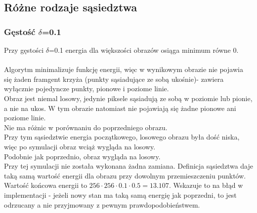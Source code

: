 \subsection{Różne rodzaje sąsiedztwa}
\subsubsection{Gęstość $\delta$=0.1}
Przy gęstości $\delta$=0.1 energia dla większości obrazów osiąga minimum równe 0.\\
\\
Algorytm minimalizuje funkcję energii, więc w wynikowym obrazie nie pojawia się żaden framgent krzyża (punkty sąsiadujące ze sobą ukośnie)- zawiera wyłącznie pojedyncze punkty, pionowe i poziome linie.\\
Obraz jest niemal losowy, jedynie piksele sąsiadują ze sobą w poziomie lub pionie, a nie na ukos.
W tym obrazie natomiast nie pojawiają się żadne pionowe ani poziome linie.\\
Nie ma różnic w porównaniu do poprzedniego obrazu.\\
Przy tym sąsiedztwie energia początkowego, losowego obrazu była dość niska, więc po symulacji obraz wciąż wygląda na losowy.\\
Podobnie jak poprzednio, obraz wygląda na losowy.\\
Przy tej symulacji nie została wykonana żadna zamiana. Definicja sąsiedztwa daje taką samą wartość energii dla obrazu przy dowolnym przemieszczeniu punktów. Wartość końcowa energii to $256\cdot 256\cdot 0.1\cdot 0.5 = 13.107$. Wskazuje to na błąd w implementacji - jeżeli nowy stan ma taką samą energię jak poprzedni, to jest odrzucany a nie przyjmowany z pewnym prawdopodobieństwem.\\
